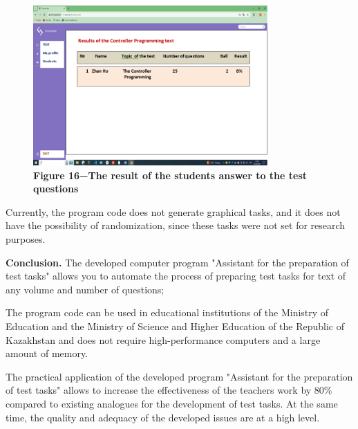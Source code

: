 \begin{figure}[H]
	\centering
	\includegraphics[height=0.35\textwidth, width=0.8\textwidth]{assets/141}
	\caption*{\bfseries Figure 16−The result of the student\textquotesingle s answer to
	the test questions}
\end{figure}

\begin{multicols}{2}
Currently, the program code does not generate graphical tasks, and it
does not have the possibility of randomization, since these tasks were
not set for research purposes.

{\bfseries Conclusion.} The developed computer program "Assistant for the
preparation of test tasks" allows you to automate the process of
preparing test tasks for text of any volume and number of questions;

The program code can be used in educational institutions of the Ministry
of Education and the Ministry of Science and Higher Education of the
Republic of Kazakhstan and does not require high-performance computers
and a large amount of memory.

The practical application of the developed program "Assistant for the
preparation of test tasks" allows to increase the effectiveness of the
teacher\textquotesingle s work by 80\% compared to existing analogues
for the development of test tasks. At the same time, the quality and
adequacy of the developed issues are at a high level.
\end{multicols}


